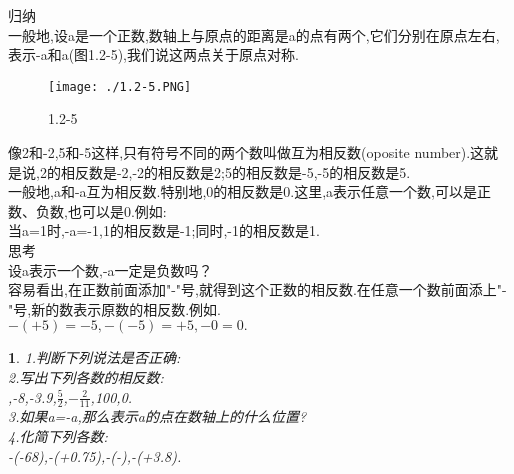 \documentclass{article}
\newtheorem{exercise}{ }
\begin{document}
	归纳\\
	\indent 一般地,设a是一个正数,数轴上与原点的距离是a的点有两个,它们分别在原点左右,表示-a和a(图1.2-5),我们说这两点关于原点对称.\\
	\begin{figure}[ht!]
		\centering
		\texttt{[image: ./1.2-5.PNG]}
		\caption{1.2-5}
	\end{figure}
	\indent 像2和-2,5和-5这样,只有符号不同的两个数叫做互为相反数(oposite number).这就是说,2的相反数是-2,-2的相反数是2;5的相反数是-5,-5的相反数是5.\\
	\indent 一般地,a和-a互为相反数.特别地,0的相反数是0.这里,a表示任意一个数,可以是正数、负数,也可以是0.例如:\\
	\indent 当a=1时,-a=-1,1的相反数是-1;同时,-1的相反数是1.\\
	思考\\
	\indent 设a表示一个数,-a一定是负数吗？\\
	\indent 容易看出,在正数前面添加"-"号,就得到这个正数的相反数.在任意一个数前面添上"-"号,新的数表示原数的相反数.例如.\\
	\indent $-(+5)=-5, -(-5)=+5, -0=0.$\\
	\begin{exercise}
		1.判断下列说法是否正确:\\	
		\newcommand{\fourch}[4]{
			\indent\makebox[262pt][l]{\qquad(A) #1}\\
			\indent\makebox[262pt][l]{\qquad(B) #2}\\
			\indent\makebox[262pt][l]{\qquad(C) #3}\\
			\indent\makebox[262pt][l]{\qquad(D) #4}\\}
		2.写出下列各数的相反数:\\
		,-8,-3.9,$\frac{5}{2}$,$-\frac{2}{11}$,100,0.\\
		3.如果a=-a,那么表示a的点在数轴上的什么位置?\\
		4.化简下列各数:\\
		\indent -(-68),-(+0.75),-(-),-(+3.8).\\
	\end{exercise}	
\end{document}
